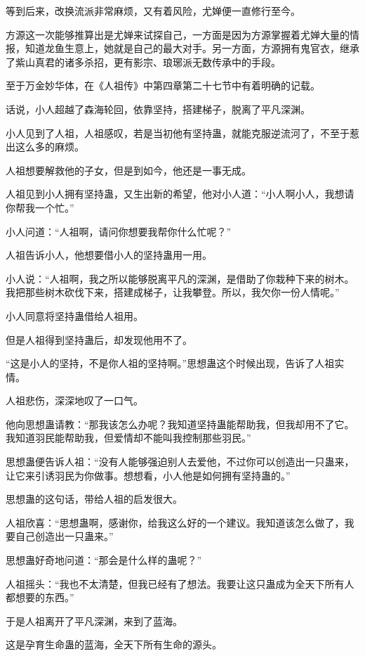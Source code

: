 \begin{this_body}
等到后来，改换流派非常麻烦，又有着风险，尤婵便一直修行至今。

方源这一次能够推算出是尤婵来试探自己，一方面是因为方源掌握着尤婵大量的情报，知道龙鱼生意上，她就是自己的最大对手。另一方面，方源拥有鬼官衣，继承了紫山真君的诸多杀招，更有影宗、琅琊派无数传承中的手段。

至于万金妙华体，在《人祖传》中第四章第二十七节中有着明确的记载。

话说，小人超越了森海轮回，依靠坚持，搭建梯子，脱离了平凡深渊。

小人见到了人祖，人祖感叹，若是当初他有坚持蛊，就能克服逆流河了，不至于惹出这么多的麻烦。

人祖想要解救他的子女，但是到如今，他还是一事无成。

人祖见到小人拥有坚持蛊，又生出新的希望，他对小人道：“小人啊小人，我想请你帮我一个忙。”

小人问道：“人祖啊，请问你想要我帮你什么忙呢？”

人祖告诉小人，他想要借小人的坚持蛊用一用。

小人说：“人祖啊，我之所以能够脱离平凡的深渊，是借助了你栽种下来的树木。我把那些树木砍伐下来，搭建成梯子，让我攀登。所以，我欠你一份人情呢。”

小人同意将坚持蛊借给人祖用。

但是人祖得到坚持蛊后，却发现他用不了。

“这是小人的坚持，不是你人祖的坚持啊。”思想蛊这个时候出现，告诉了人祖实情。

人祖悲伤，深深地叹了一口气。

他向思想蛊请教：“那我该怎么办呢？我知道坚持蛊能帮助我，但我却用不了它。我知道羽民能帮助我，但爱情却不能叫我控制那些羽民。”

思想蛊便告诉人祖：“没有人能够强迫别人去爱他，不过你可以创造出一只蛊来，让它来引诱羽民为你做事。想想看，小人他是如何拥有坚持蛊的。”

思想蛊的这句话，带给人祖的启发很大。

人祖欣喜：“思想蛊啊，感谢你，给我这么好的一个建议。我知道该怎么做了，我要自己创造出一只蛊来。”

思想蛊好奇地问道：“那会是什么样的蛊呢？”

人祖摇头：“我也不太清楚，但我已经有了想法。我要让这只蛊成为全天下所有人都想要的东西。”

于是人祖离开了平凡深渊，来到了蓝海。

这是孕育生命蛊的蓝海，全天下所有生命的源头。


\end{this_body}
